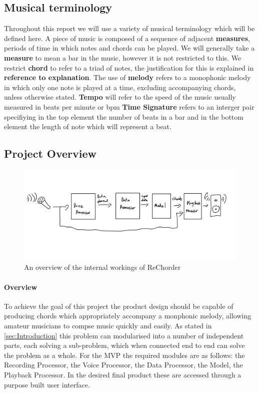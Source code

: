 \subsection{Musical terminology}

Throughout this report we will use a variety of musical terminology which will be defined here. A piece of music is composed of a sequence of adjacent \textbf{measures}, periods of time in which notes and chords can be played. 
We will generally take a \textbf{measure} to mean a bar in the music, however it is not restricted to this. We restrict \textbf{chord} to refer to a triad of notes, the justification for this is explained in \textbf{reference to explanation}.
The use of \textbf{melody} refers to a monophonic melody in which only one note is played at a time, excluding accompanying chords, unless otherwise stated.
\textbf{Tempo} will refer to the speed of the music usually measured in beats per minute or bpm
\textbf{Time Signature} refers to an interger pair specifiying in the top element the number of beats in a bar and in the bottom element the length of note which will represent a beat.


\subsection{Project Overview}
\begin{figure}
    \centering
    \includegraphics[width=0.8\columnwidth]{Figures/MVPOverview}
    \decoRule
    \caption[]{An overview of the internal workings of ReChorder}
    \label{fig:MVPOverview}
\end{figure}

\paragraph{Overview}
To achieve the goal of this project the product design should be capable of producing chords which appropriately accompany a monphonic melody, allowing amateur musicians to compse music quickly and easily.
As stated in \ref{sec:Introduction} this problem can modularised into a number of independent parts, each solving a sub-problem, which when connected end to end can solve the problem as a whole.
For the MVP the required modules are as follows: the Recording Processor, the Voice Processor, the Data Processor, the Model, the Playback Processor.
In the desired final product these are accessed through a purpose built user interface.

